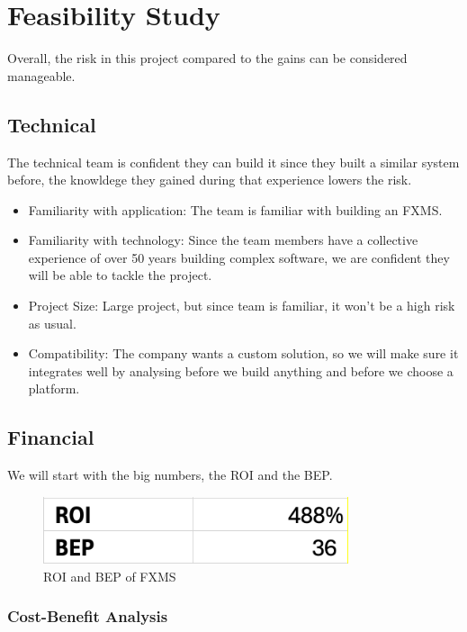\documentclass[a4paper]{report}
\begin{document}
\chapter{Feasibility Study}

Overall, the risk in this project compared to the gains can be considered manageable.

\section{Technical}

The technical team is confident they can build it since they built a similar system before, the knowldege they gained during that experience lowers the risk.

\begin{itemize}
    \item Familiarity with application: The team is familiar with building an FXMS.
    \item Familiarity with technology: Since the team members have a collective experience of over 50 years building complex software, we are confident they will be able to tackle the project.
    \item Project Size: Large project, but since team is familiar, it won't be a high risk as usual.
    \item Compatibility: The company wants a custom solution, so we will make sure it integrates well by analysing before we build anything and before we choose a platform.
\end{itemize}

\section{Financial}

We will start with the big numbers, the ROI and the BEP.

\begin{figure}[h!]
    \centering
    \includegraphics[width=0.8\textwidth]{images/roi-bep.png}
    \caption{ROI and BEP of FXMS}
    \label{fig:roi-and-bep}
\end{figure}

\subsection{Cost-Benefit Analysis}
\end{document}

